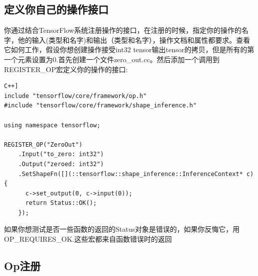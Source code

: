 \documentclass{book}
\begin{document}
\subsection{定义你自己的操作接口}
你通过结合TensorFlow系统注册操作的接口，在注册的时候，指定你的操作的名字，他的输入(类型和名字)和输出（类型和名字），操作文档和属性都要求。查看它如何工作，假设你想创建操作接受int32 tensor输出tensor的拷贝，但是所有的第一个元素设置为0.首先创建一个文件zero\_out.cc。然后添加一个调用到REGISTER\_OP宏定义你的操作的接口:
\begin{lstlisting}[language=[GNU]C++]
include "tensorflow/core/framework/op.h"
#include "tensorflow/core/framework/shape_inference.h"

using namespace tensorflow;

REGISTER_OP("ZeroOut")
    .Input("to_zero: int32")
    .Output("zeroed: int32")
    .SetShapeFn([](::tensorflow::shape_inference::InferenceContext* c) {
      c->set_output(0, c->input(0));
      return Status::OK();
    });
\end{lstlisting}
如果你想测试是否一些函数的返回的Status对象是错误的，如果你反悔它，用OP\_REQUIRES\_OK.这些宏都来自函数错误时的返回
\subsection{Op注册}
\end{document}
